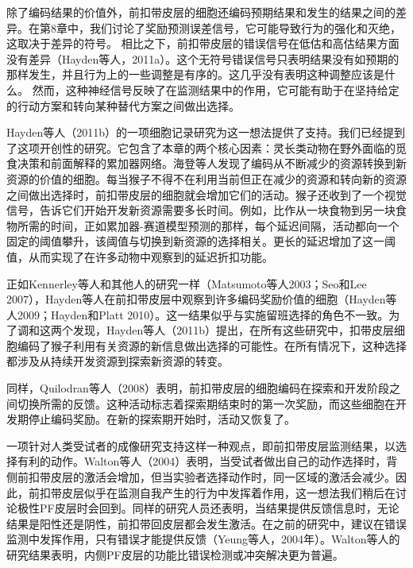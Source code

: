 除了编码结果的价值外，前扣带皮层的细胞还编码预期结果和发生的结果之间的差异。在第8章中，我们讨论了奖励预测误差信号，它可能导致行为的强化和灭绝，这取决于差异的符号。
相比之下，前扣带皮层的错误信号在低估和高估结果方面没有差异（Hayden等人，2011a）。这个无符号错误信号只表明结果没有如预期的那样发生，并且行为上的一些调整是有序的。这几乎没有表明这种调整应该是什么。
然而，这种神经信号反映了在监测结果中的作用，它可能有助于在坚持给定的行动方案和转向某种替代方案之间做出选择。\par
Hayden等人（2011b）的一项细胞记录研究为这一想法提供了支持。我们已经提到了这项开创性的研究。它包含了本章的两个核心因素：灵长类动物在野外面临的觅食决策和前面解释的累加器网络。海登等人发现了编码从不断减少的资源转换到新资源的价值的细胞。每当猴子不得不在利用当前但正在减少的资源和转向新的资源之间做出选择时，前扣带皮层的细胞就会增加它们的活动。猴子还收到了一个视觉信号，告诉它们开始开发新资源需要多长时间。例如，比作从一块食物到另一块食物所需的时间，正如累加器-赛道模型预测的那样，每个延迟间隔，活动都向一个固定的阈值攀升，该阈值与切换到新资源的选择相关。更长的延迟增加了这一阈值，从而实现了在许多动物中观察到的延迟折扣功能。\par
正如Kennerley等人和其他人的研究一样（Matsumoto等人2003；Seo和Lee 2007），Hayden等人在前扣带皮层中观察到许多编码奖励价值的细胞（Hayden等人2009；Hayden和Platt 2010）。这一结果似乎与实施留班选择的角色不一致。为了调和这两个发现，Hayden等人（2011b）提出，在所有这些研究中，扣带皮层细胞编码了猴子利用有关资源的新信息做出选择的可能性。在所有情况下，这种选择都涉及从持续开发资源到探索新资源的转变。\par
同样，Quilodran等人（2008）表明，前扣带皮层的细胞编码在探索和开发阶段之间切换所需的反馈。这种活动标志着探索期结束时的第一次奖励，而这些细胞在开发期停止编码奖励。在新的探索期开始时，活动又恢复了。\par
一项针对人类受试者的成像研究支持这样一种观点，即前扣带皮层监测结果，以选择有利的动作。Walton等人（2004）表明，当受试者做出自己的动作选择时，背侧前扣带皮层的激活会增加，但当实验者选择动作时，同一区域的激活会减少。因此，前扣带皮层似乎在监测自我产生的行为中发挥着作用，这一想法我们稍后在讨论极性PF皮层时会回到。同样的研究人员还表明，当结果提供反馈信息时，无论结果是阳性还是阴性，前扣带回皮层都会发生激活。在之前的研究中，建议在错误监测中发挥作用，只有错误才能提供反馈（Yeung等人，2004年）。Walton等人的研究结果表明，内侧PF皮层的功能比错误检测或冲突解决更为普遍。\par
